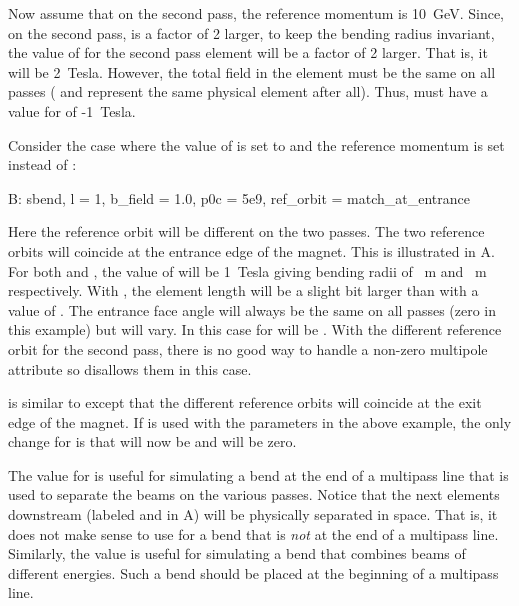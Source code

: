 Now assume that on the second pass, the reference momentum is 10~GeV.
Since, on the second pass,  is a factor of 2 larger, to keep
the bending radius invariant, the value of  for the second
pass element  will be a factor of 2 larger. That is, it will
be 2~Tesla. However, the total field in the element must be the
same on all passes ( and  represent the same
physical element after all). Thus,  must have a value for
 of -1~Tesla.

Consider the case where the value of
 is set to  and the reference
momentum is set instead of :
\begin{example} 
  B: sbend, l = 1, b_field = 1.0, p0c = 5e9, ref_orbit = match_at_entrance
\end{example}
Here the reference orbit will be different on the two passes. The two
reference orbits will coincide at the entrance edge of the magnet.
This is illustrated in A. For both
 and , the value of  will be 1~Tesla
giving bending radii of ~m and ~m respectively. With
, the element length will be a slight bit larger than
 with a value of . The entrance face angle
 will always be the same on all passes (zero in this example)
but  will vary. In this case  for  will be
. With the different reference orbit for the second pass,
there is no good way to handle a non-zero multipole attribute so \bmad
disallows them in this case.

 is similar to  except that
the different reference orbits will coincide at the exit edge of the
magnet. If  is used with the parameters in the above
example, the only change for  is that  will now be
 and  will be zero.

The  value for  is useful
for simulating a bend at the end of a multipass line that is used to
separate the beams on the various passes. Notice that the next
elements downstream (labeled  and  in
A) will be physically separated in
space. That is, it does not make sense to use 
for a bend that is {\em not} at the end of a multipass
line. Similarly, the  value is useful for simulating
a bend that combines beams of different energies. Such a bend should
be placed at the beginning of a multipass line.

